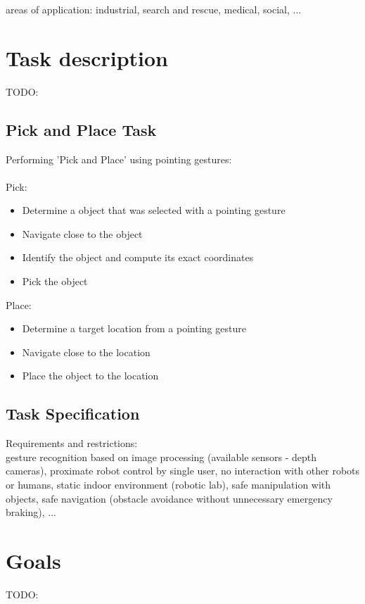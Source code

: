 areas of application: industrial, search and rescue, medical, social, ...\\

\section{Task description}
TODO:\par
\subsection{Pick and Place Task}

Performing 'Pick and Place' using pointing gestures:\\ \\
Pick:\\
\begin{itemize}
\item {Determine a object that was selected with a pointing gesture}
\item {Navigate close to the object}
\item {Identify the object and compute its exact coordinates}
\item {Pick the object}
\end{itemize}


Place:\\
\begin{itemize}
\item {Determine a target location from a pointing gesture}
\item {Navigate close to the location}
\item {Place the object to the location}
\end{itemize}

\subsection{Task Specification}

Requirements and restrictions:\\
gesture recognition based on image processing (available sensors - depth cameras), proximate robot control by single user, no interaction with other robots or humans, static indoor environment (robotic lab), safe manipulation with objects, safe navigation (obstacle avoidance without unnecessary emergency braking), ...

\section{Goals}
TODO:\par
